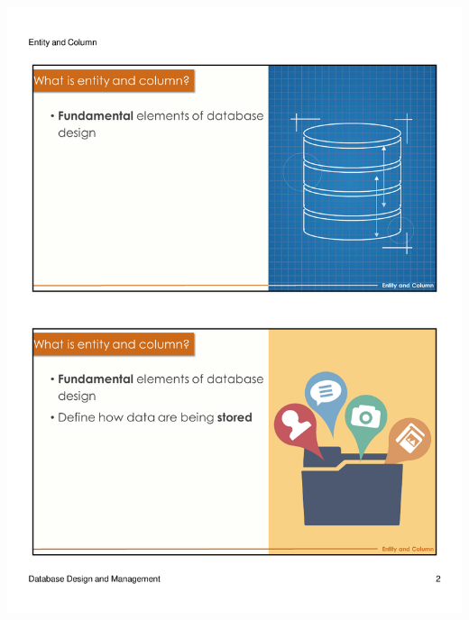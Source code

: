 \begin{frame}{ }
    \centering
    \includegraphics[width=\textwidth, trim={10mm 134mm 10mm 22mm}, clip]{resources/02/02_2}
\end{frame}
